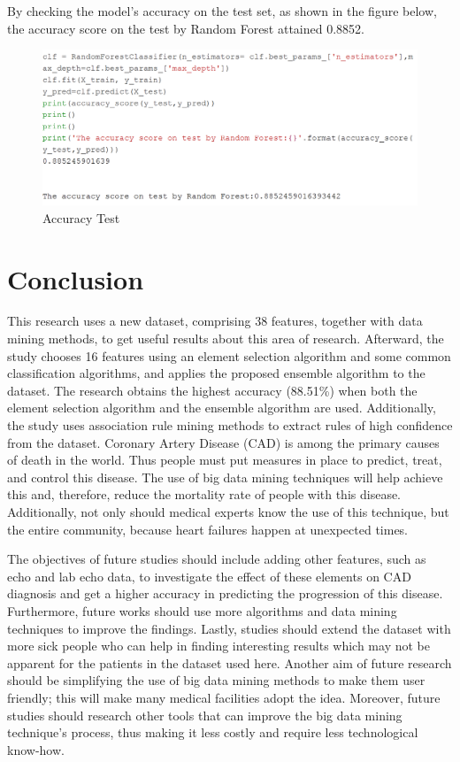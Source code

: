 By checking the model's accuracy on the test set, as shown in the
figure below, the accuracy score on the test by Random Forest attained
0.8852.

\begin{figure}
    \centering
    \includegraphics[width=1.0\columnwidth]{images/Untitled7.png}
    \caption{Accuracy Test}\label{Accuracy}
\end{figure}



\section{Conclusion}
This research uses a new dataset, comprising 38 features, together
with data mining methods, to get useful results about this  area of
research. Afterward, the study chooses 16 features using an element 
selection algorithm and some common classification algorithms, and
applies the proposed ensemble algorithm to the dataset. 
The research obtains the highest accuracy (88.51\%) when both the
element selection algorithm and the ensemble algorithm are  used.
Additionally, the study uses association rule mining methods to
extract rules of high confidence from the dataset. 
Coronary Artery Disease (CAD) is among the primary causes of death in
the world. 
Thus people must put measures in place to predict, treat, and control
this disease. 
The use of big data mining techniques will help achieve this and,
therefore, reduce the  mortality rate of people with this disease.
Additionally, not only should medical experts know the use of this
technique, but the  entire community, because heart failures happen at
unexpected times. 
\par The objectives of future studies should include adding other
features, such as echo and lab echo data, to investigate the effect of
these elements on CAD diagnosis and get a higher accuracy in
predicting the progression of this disease. Furthermore, future works
should use more algorithms and data mining techniques to improve the
findings. Lastly, studies should extend the dataset with more sick
people who can help in finding interesting results which may not be
apparent for the patients in the dataset used here. Another aim of
future research should be simplifying the use of big data mining
methods to make them user friendly; this will make many medical
facilities adopt the idea. Moreover, future studies should research
other tools that can improve the big data mining technique's process,
thus making it less costly and require less technological know-how.


